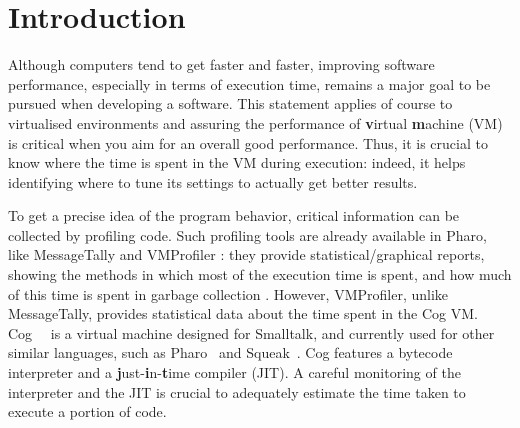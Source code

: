 \documentclass[10pt,nonatbib]{sigplanconf}
\newcommand{\ct}{\lstinline[backgroundcolor=\color{white},basicstyle=\small\ttfamily]}
\begin{document}






\section{Introduction}

%
%
%
%
%
%



Although computers tend to get faster and faster, improving software performance, especially in terms of execution time, remains a major goal to be pursued when developing a software. This statement applies of course to virtualised environments and assuring the performance of \textbf{v}irtual \textbf{m}achine (VM) is critical when you aim for an overall good performance. 
Thus, it is crucial to know where the time is spent in the VM during execution: indeed, it helps identifying where to tune its settings to actually get better results.

To get a precise idea of the program behavior, critical information can be collected by profiling code.
Such profiling tools are already available in Pharo, like MessageTally \cite{Berg13a} and VMProfiler \cite{Mira08b}: they provide statistical/graphical reports, showing the methods in which most of the execution time is spent, and how much of this time is spent in garbage collection \cite{Berg13a}. However, VMProfiler, unlike MessageTally, provides statistical data about the time spent in the Cog VM. Cog~\cite{Mira08a}~ is a virtual machine designed for Smalltalk, and currently used for other similar languages, such as Pharo~\cite{Blac09a} and Squeak~\cite{Blac07a}. Cog features a bytecode interpreter and a \textbf{j}ust-\textbf{i}n-\textbf{t}ime compiler (JIT). A careful monitoring of the interpreter and the JIT is crucial to adequately estimate the time taken to execute a portion of code.\\
\end{document}
